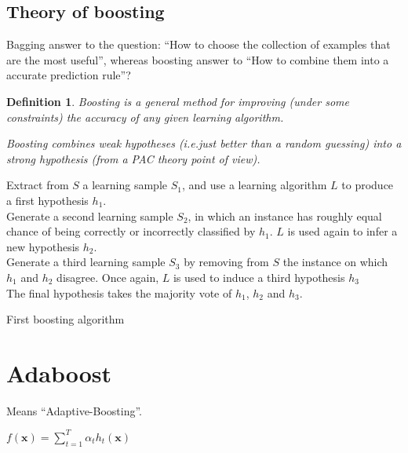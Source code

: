 \documentclass{article}
\newtheorem{defi}{Definition}
\begin{document}
\subsection{Theory of boosting}
Bagging answer to the question: ``How to choose the collection of examples that are the most useful'', whereas boosting answer to ``How to combine them into a accurate prediction rule''?


\begin{defi}
Boosting is a general method for improving (under some constraints) the accuracy of any given learning algorithm.

Boosting combines \emph{weak} hypotheses (i.e.just better than a random guessing) into a \emph{strong} hypothesis (from a PAC theory point of view).
\end{defi}

\begin{algorithm}
Extract from $S$ a learning sample $S_1$, and use a learning algorithm $L$ to produce a first hypothesis $h_1$.\\
Generate a second learning sample $S_2$, in which an instance has roughly equal chance of being correctly or incorrectly classified by $h_1$. $L$ is used again to infer a new hypothesis $h_2$.\\
Generate a third learning sample $S_3$ by removing from $S$ the instance on which $h_1$ and $h_2$ disagree. Once again, $L$ is used to induce a third hypothesis $h_3$\\
The final hypothesis takes the majority vote of $h_1$, $h_2$ and $h_3$.
\caption{First boosting algorithm}
\end{algorithm}

\section{Adaboost}
Means ``Adaptive-Boosting''.

\begin{algorithm}
$f(\mathbf{x})=\sum_{t=1}^T \alpha_t h_t(\mathbf{x})$\;
\end{algorithm}
\end{document}

